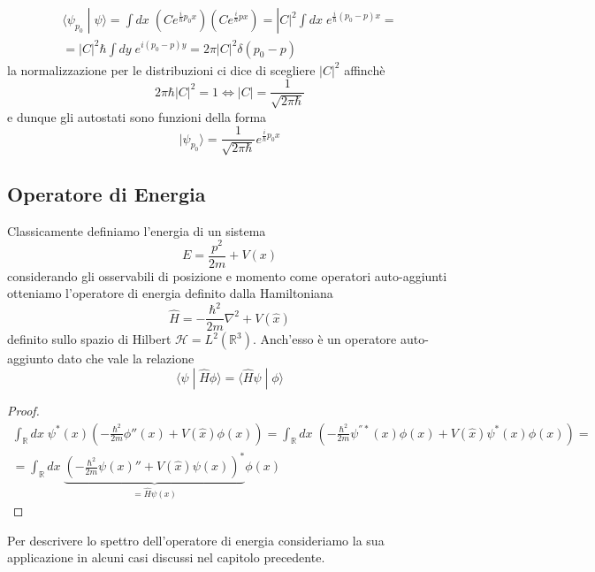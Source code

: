\begin{equation*}
	\begin{array}{l}
		\langle \psi_{p_0} \;|\; \psi \rangle = \int dx \; \left ( C e^{\frac{i}{\hbar} p_0 x}\right)\left ( C e^{\frac{i}{\hbar}px} \right )  = |C|^2 \int dx \; e^{\frac{i}{\hbar} (p_0-p)x} = \\[0.5cm]
		= |C|^2 \hbar \int dy \; e^{i(p_0-p)y} = 2 \pi |C|^2 \delta(p_0 -p)  
	\end{array}
\end{equation*}
la normalizzazione per le distribuzioni ci dice di scegliere $|C|^2$ affinch\`e 
\begin{equation*}
	2\pi \hbar |C|^2 =1 \iff |C| = \frac{1}{\sqrt{2\pi \hbar}}
\end{equation*}
e dunque gli autostati sono funzioni della forma
\begin{equation*}
	|\psi_{p_0} \rangle = \frac{1}{\sqrt{2\pi \hbar}} e^{\frac{i}{\hbar}p_0x}
\end{equation*}
\subsection{Operatore di Energia}

Classicamente definiamo l'energia di un sistema 
\begin{equation*}
	E = \frac{p^2}{2m} + V(x) 
\end{equation*}	
considerando gli osservabili di posizione e momento come operatori auto-aggiunti otteniamo l'operatore di energia definito dalla Hamiltoniana 
\begin{equation*}
\hat{H} = -\frac{\hbar^2}{2m} \nabla^2 +V(\hat{x})
\end{equation*}
definito sullo spazio di Hilbert $\mathcal{H} = L^2(\mathbb{R}^3) $. Anch'esso \`e un operatore auto-aggiunto dato che vale la relazione 
\begin{equation*}
	\langle \psi \;|\; \hat{H} \phi \rangle = \langle \hat{H} \psi \; | \; \phi \rangle 
\end{equation*}

\begin{proof}
\begin{equation*}
	\begin{array}{l}
	\int_{\mathbb{R}}dx \;  \psi^*(x) \left (  -\frac{\hbar^2}{2m} \phi''(x) +V(\hat{x})\phi(x)\right ) =  \int_{\mathbb{R}} dx \; \left ( -\frac{\hbar^2}{2m} \psi^{''*}(x)\phi(x) +V(\hat{x})\psi^*(x) \phi(x)\right ) = \\[0.5cm]
	= \int_{\mathbb{R}}dx \;\underbrace{\left( -\frac{\hbar^2}{2m}\psi(x)'' + V(\hat{x}) \psi(x) \right)^*}_{= \hat{H} \psi(x)}\phi(x)
	\end{array} 
\end{equation*}
\end{proof}
\noindent Per descrivere lo spettro dell'operatore di energia consideriamo la sua applicazione in alcuni casi discussi nel capitolo precedente. 
\newpage

